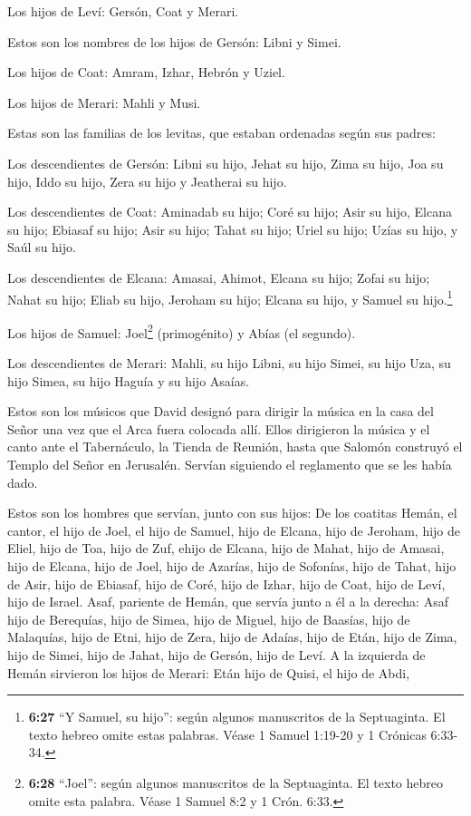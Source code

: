  Los hijos de Leví: Gersón, Coat y Merari.

 Estos son los nombres de los hijos de Gersón: Libni y
Simei.

 Los hijos de Coat: Amram, Izhar, Hebrón y Uziel.

 Los hijos de Merari: Mahli y Musi.

Estas son las familias de los levitas, que estaban ordenadas según sus
padres:

 Los descendientes de Gersón: Libni su hijo, Jehat su hijo,
Zima su hijo,  Joa su hijo, Iddo su hijo, Zera su hijo y
Jeatherai su hijo.

 Los descendientes de Coat: Aminadab su hijo; Coré su hijo;
Asir su hijo,  Elcana su hijo; Ebiasaf su hijo; Asir su
hijo;  Tahat su hijo; Uriel su hijo; Uzías su hijo, y Saúl
su hijo.

 Los descendientes de Elcana: Amasai, Ahimot, 
Elcana su hijo; Zofai su hijo; Nahat su hijo;  Eliab su
hijo, Jeroham su hijo; Elcana su hijo, y Samuel su hijo.\footnote{\textbf{6:27}
  ``Y Samuel, su hijo'': según algunos manuscritos de la Septuaginta. El
  texto hebreo omite estas palabras. Véase 1 Samuel 1:19-20 y 1 Crónicas
  6:33-34.}

 Los hijos de Samuel: Joel\footnote{\textbf{6:28} ``Joel'':
  según algunos manuscritos de la Septuaginta. El texto hebreo omite
  esta palabra. Véase 1 Samuel 8:2 y 1 Crón. 6:33.} (primogénito) y
Abías (el segundo).

 Los descendientes de Merari: Mahli, su hijo Libni, su hijo
Simei, su hijo Uza,  su hijo Simea, su hijo Haguía y su
hijo Asaías.

 Estos son los músicos que David designó para dirigir la
música en la casa del Señor una vez que el Arca fuera colocada allí.
 Ellos dirigieron la música y el canto ante el Tabernáculo,
la Tienda de Reunión, hasta que Salomón construyó el Templo del Señor en
Jerusalén. Servían siguiendo el reglamento que se les había dado.

 Estos son los hombres que servían, junto con sus hijos: De
los coatitas Hemán, el cantor, el hijo de Joel, el hijo de Samuel,
 hijo de Elcana, hijo de Jeroham, hijo de Eliel, hijo de
Toa,  hijo de Zuf, ehijo de Elcana, hijo de Mahat, hijo de
Amasai,  hijo de Elcana, hijo de Joel, hijo de Azarías,
hijo de Sofonías,  hijo de Tahat, hijo de Asir, hijo de
Ebiasaf, hijo de Coré,  hijo de Izhar, hijo de Coat, hijo
de Leví, hijo de Israel.  Asaf, pariente de Hemán, que
servía junto a él a la derecha: Asaf hijo de Berequías, hijo de Simea,
 hijo de Miguel, hijo de Baasías, hijo de Malaquías,
 hijo de Etni, hijo de Zera, hijo de Adaías, 
hijo de Etán, hijo de Zima, hijo de Simei,  hijo de Jahat,
hijo de Gersón, hijo de Leví.  A la izquierda de Hemán
sirvieron los hijos de Merari: Etán hijo de Quisi, el hijo de Abdi,

